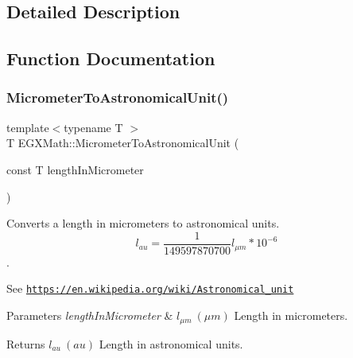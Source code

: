 \subsection{Detailed Description}


\subsection{Function Documentation}
\mbox{\label{group___e_g_x_math-_conversions-_length_conversions-_s_i-_micrometer-_astronomical_ga910b8baeb25ec569394e5563afebc70f}} 
\subsubsection{\texorpdfstring{Micrometer\+To\+Astronomical\+Unit()}{MicrometerToAstronomicalUnit()}}
{\footnotesize\ttfamily template$<$typename T $>$ \\
T E\+G\+X\+Math\+::\+Micrometer\+To\+Astronomical\+Unit (\begin{DoxyParamCaption}\item[{const T}]{length\+In\+Micrometer }\end{DoxyParamCaption})}



Converts a length in micrometers to astronomical units. \[ l_{au}= \frac{1}{149597870700} l_{\mu m} * 10^{-6} \]. 

See \href{https://en.wikipedia.org/wiki/Astronomical_unit}{\tt https\+://en.\+wikipedia.\+org/wiki/\+Astronomical\+\_\+unit} 
\begin{DoxyParams}{Parameters}
{\em length\+In\+Micrometer} & $ l_{\mu m}\ (\mu m)$ Length in micrometers. \\
\hline
\end{DoxyParams}
\begin{DoxyReturn}{Returns}
$ l_{au}\ (au)$ Length in astronomical units. 
\end{DoxyReturn}
\mbox{\label{group___e_g_x_math-_conversions-_length_conversions-_s_i-_micrometer-_astronomical_ga17ce0795cd099de3fd453a455f0a2260}} 
